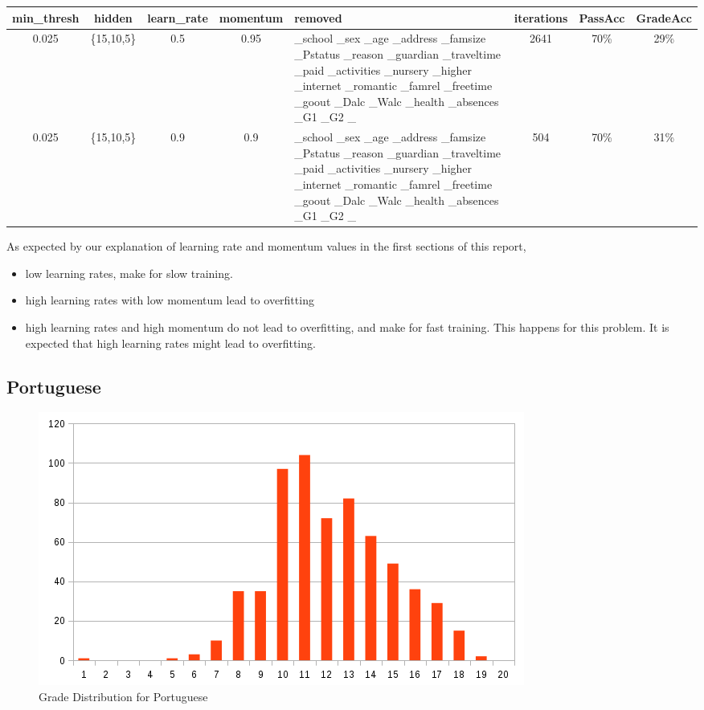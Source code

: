 \documentclass[11pt]{article}
\begin{document}
\newpage
\begin{tabular}{| c | c | c | c | p{3cm} | c | c | c |}
\hline \textbf{min\_thresh} & \textbf{hidden} & \textbf{learn\_rate} & \textbf{momentum} & \textbf{removed} & \textbf{iterations} & \textbf{PassAcc} & \textbf{GradeAcc}\\
\hline 0.025 & \{15,10,5\} & 0.5 & 0.95 & \_school \_sex \_age \_address \_famsize \_Pstatus \_reason \_guardian \_traveltime \_paid \_activities \_nursery \_higher \_internet \_romantic \_famrel \_freetime \_goout \_Dalc \_Walc \_health \_absences \_G1 \_G2 \_ & 2641 & 70\% & 29\%\\
\hline 0.025 & \{15,10,5\} & 0.9 & 0.9 & \_school \_sex \_age \_address \_famsize \_Pstatus \_reason \_guardian \_traveltime \_paid \_activities \_nursery \_higher \_internet \_romantic \_famrel \_freetime \_goout \_Dalc \_Walc \_health \_absences \_G1 \_G2 \_ & 504 & 70\% & 31\%\\
\hline
\end{tabular}

As expected by our explanation of learning rate and momentum values in the first sections of this report,
\begin{itemize}
\item low learning rates, make for slow training.
\item high learning rates with low momentum lead to overfitting
\item high learning rates and high momentum do not lead to overfitting, and make for fast training. This happens for this problem. It is expected that high learning rates might lead to overfitting.
\end{itemize}

\hfill \break
\hfill \break
\subsection{Portuguese}
\begin{figure}[H]
\label{fig:Grade Distribution for Portuguese}
\includegraphics[scale=0.6]{por-chart.png}
\centering
\caption{Grade Distribution for Portuguese}
\end{figure}
\end{document}
